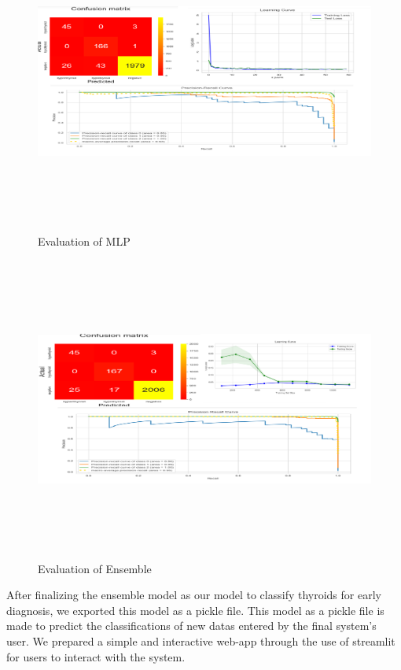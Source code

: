 \begin{figure}[h]
\centering
\includegraphics[scale=0.5, height=10cm, width=15.5cm]{multil.png}
\caption{Evaluation of MLP}
\end{figure}

\begin{figure}[t]
\centering
\includegraphics[scale=0.45, height=10cm, width=15cm]{ensemble.png}
\caption{Evaluation of Ensemble}
\end{figure}

After finalizing the ensemble model as our model to classify thyroids for early diagnosis, we exported this model as a pickle file. This model as a pickle file is made to predict the classifications of new datas entered by the final system's user. We prepared a simple and interactive web-app through the use of streamlit for users to interact with the system.\\
